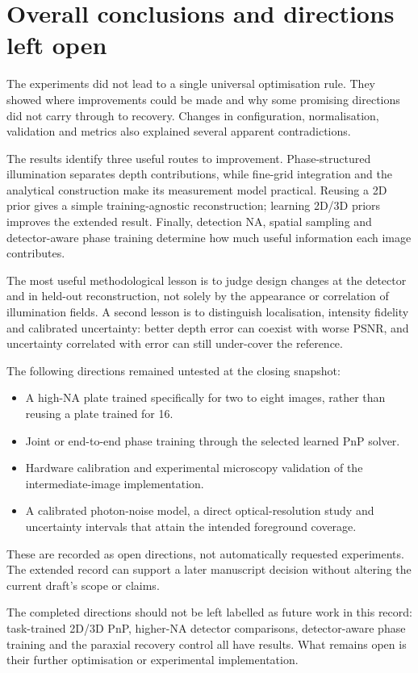 \section{Overall conclusions and directions left open}

The experiments did not lead to a single universal optimisation rule. They showed where improvements could be made and why some promising directions did not carry through to recovery. Changes in configuration, normalisation, validation and metrics also explained several apparent contradictions.

The results identify three useful routes to improvement. Phase-structured illumination separates depth contributions, while fine-grid integration and the analytical construction make its measurement model practical. Reusing a 2D prior gives a simple training-agnostic reconstruction; learning 2D/3D priors improves the extended result. Finally, detection NA, spatial sampling and detector-aware phase training determine how much useful information each image contributes.

The most useful methodological lesson is to judge design changes at the detector and in held-out reconstruction, not solely by the appearance or correlation of illumination fields. A second lesson is to distinguish localisation, intensity fidelity and calibrated uncertainty: better depth error can coexist with worse PSNR, and uncertainty correlated with error can still under-cover the reference.

The following directions remained untested at the closing snapshot:

\begin{itemize}
\item A high-NA plate trained specifically for two to eight images, rather than reusing a plate trained for 16.
\item Joint or end-to-end phase training through the selected learned PnP solver.
\item Hardware calibration and experimental microscopy validation of the intermediate-image implementation.
\item A calibrated photon-noise model, a direct optical-resolution study and uncertainty intervals that attain the intended foreground coverage.
\end{itemize}

These are recorded as open directions, not automatically requested experiments. The extended record can support a later manuscript decision without altering the current draft's scope or claims.

The completed directions should not be left labelled as future work in this record: task-trained 2D/3D PnP, higher-NA detector comparisons, detector-aware phase training and the paraxial recovery control all have results. What remains open is their further optimisation or experimental implementation.
